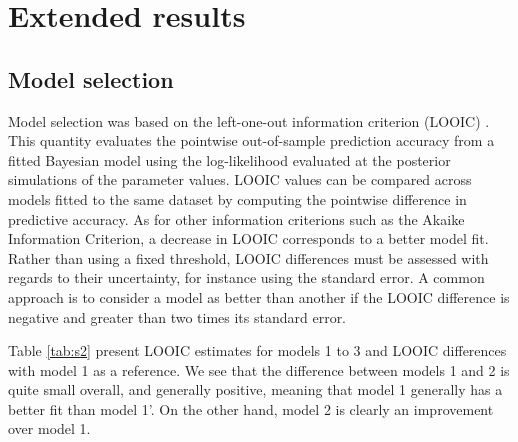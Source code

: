 \documentclass{article}
\begin{document}
	
	\section{Extended results}
	
	\subsection{Model selection}
	
	Model selection was based on the left-one-out information criterion (LOOIC) \cite{vehtari2017practical}. 
	This quantity evaluates the pointwise out-of-sample prediction accuracy from a fitted Bayesian model using the log-likelihood evaluated at the posterior simulations of the parameter values.
	LOOIC values can be compared across models fitted to the same dataset by computing the pointwise difference in predictive accuracy. 
	As for other information criterions such as the Akaike Information Criterion, a decrease in LOOIC corresponds to a better model fit.
	Rather than using a fixed threshold, LOOIC differences must be assessed with regards to their uncertainty, for instance using the standard error.
	A common approach is to consider a model as better than another if the LOOIC difference is negative and greater than two times its standard error.
	
	Table \ref{tab:s2} present LOOIC estimates for models 1 to 3 and LOOIC differences with model 1 as a reference. 
	We see that the difference between models 1 and 2 is quite small overall, and generally positive, meaning that model 1 generally has a better fit than model 1'. 
	On the other hand, model 2 is clearly an improvement over model 1.
	
\end{document}
